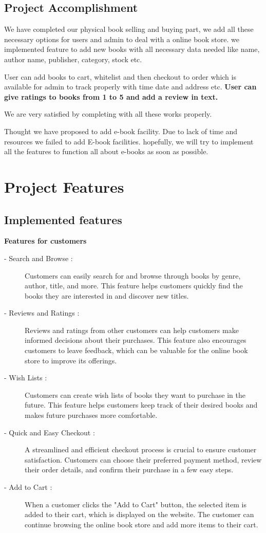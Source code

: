 \documentclass[12pt,a4paper]{article}
\begin{document}
\subsection{Project Accomplishment}
We have completed our physical book selling and buying part, we add all these necessary options for users and admin to deal with a online book store. we implemented feature to add new books with all necessary data needed like name, author name, publisher, category, stock etc.

User can add books to cart, whitelist and then checkout to order which is available for admin to track properly with time date and address etc. \textbf{User can give ratings to books from 1 to 5 and add a review in text.}

We are very satisfied by completing with all these works properly.
\vspace{5mm} %

Thought we have proposed to add e-book facility. Due to lack of time and resources we failed to add E-book facilities. hopefully, we will try to implement all the features to function all about e-books as soon as possible.
\pagebreak
\section{Project Features}
\subsection{Implemented features}

{\large\textbf{Features for customers}}
\begin{description}
    \item[- Search and Browse :] Customers can easily search for and browse through books by genre, author, title, and more. This feature helps customers quickly find the books they are interested in and discover new titles.
    \item[- Reviews and Ratings :] Reviews and ratings from other customers can help customers make informed decisions about their purchases. This feature also encourages customers to leave feedback, which can be valuable for the online book store to improve its offerings.
    \item[- Wish Lists :] Customers can create wish lists of books they want to purchase in the future. This feature helps customers keep track of their desired books and makes future purchases more comfortable.
    \item[- Quick and Easy Checkout :] A streamlined and efficient checkout process is crucial to ensure customer satisfaction. Customers can choose their preferred payment method, review their order details, and confirm their purchase in a few easy steps.
    \item[- Add to Cart :] When a customer clicks the "Add to Cart" button, the selected item is added to their cart, which is displayed on the website. The customer can continue browsing the online book store and add more items to their cart.
\end{description}
\end{document}
